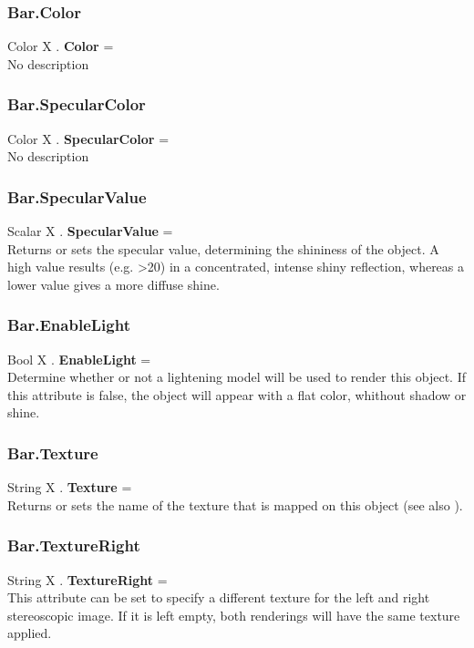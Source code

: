 \subsubsection{Bar.Color \label{F:Bar:Color}}
Color X . \textbf{Color} = \\
No description

\subsubsection{Bar.SpecularColor \label{F:Bar:SpecularColor}}
Color X . \textbf{SpecularColor} = \\
No description

\subsubsection{Bar.SpecularValue \label{F:Bar:SpecularValue}}
Scalar X . \textbf{SpecularValue} = \\
Returns or sets the specular value, determining the shininess of the object. A high value results (e.g. >20) in a concentrated, intense shiny reflection, whereas a lower value gives a more diffuse shine.

\subsubsection{Bar.EnableLight \label{F:Bar:EnableLight}}
Bool X . \textbf{EnableLight} = \\
Determine whether or not a lightening model will be used to render this object. If this attribute is false, the object will appear with a flat color, whithout shadow or shine.

\subsubsection{Bar.Texture \label{F:Bar:Texture}}
String X . \textbf{Texture} = \\
Returns or sets the name of the texture that is mapped on this object (see also ).

\subsubsection{Bar.TextureRight \label{F:Bar:TextureRight}}
String X . \textbf{TextureRight} = \\
This attribute can be set to specify a different texture for the left and right stereoscopic image. If it is left empty, both renderings will have the same texture applied.

